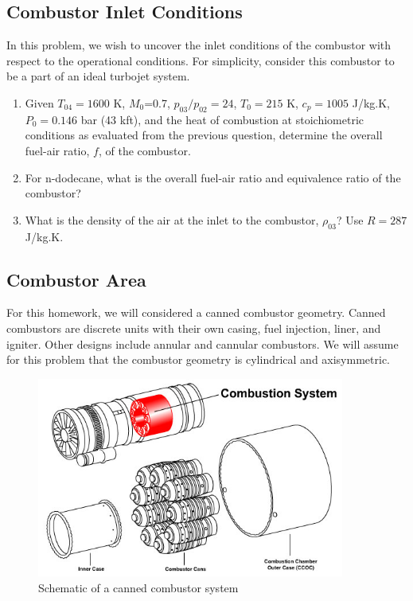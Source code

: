 \documentclass[11pt]{article}
\begin{document}
\subsection{Combustor Inlet Conditions}
In this problem, we wish to uncover the inlet conditions of the combustor with respect to the operational conditions. For simplicity, consider this combustor to be a part of an ideal turbojet system. 
\begin{enumerate}
	\item
        Given $T_{04}=1600$ K, $M_0$=0.7, $p_{03}/p_{02}=24$,  $T_0=215$ K, $c_p=1005$ J/kg.K, $P_0=0.146$ bar (43 kft), and the heat of combustion at stoichiometric conditions as evaluated from the previous question, determine the overall fuel-air ratio, $f$, of the combustor.
    \item
    	For n-dodecane, what is the overall fuel-air ratio and equivalence ratio of the combustor? 
    \item
    	What is the density of the air at the inlet to the combustor, $\rho_{03}$? Use $R=287$ J/kg.K.
\end{enumerate}
\subsection{Combustor Area}
For this homework, we will considered a canned combustor geometry. Canned combustors are discrete units with their own casing, fuel injection, liner, and igniter. Other designs include annular and cannular combustors. We will assume for this problem that the combustor geometry is cylindrical and axisymmetric. 

\begin{figure}[!ht!]
	\begin{center}
		\includegraphics[width=0.9\textwidth]{cannedCombustor.jpg}
		\caption{\label{FIG_CC} Schematic of a canned combustor system}
	\end{center}
\end{figure}
\end{document}
